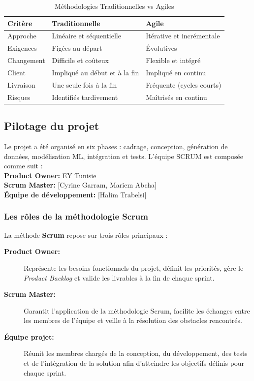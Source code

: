 \documentclass[a4paper, oneside, 12pt]{book}
\newcommand{\thead}[1]{\cellcolor{EYdark}\textcolor{white}{\textbf{#1}}}
\renewcommand{\thead}[1]{\cellcolor{EYyellow}\textcolor{EYdark}{\textbf{#1}}}
\begin{document}
\begin{table}[H]
\centering
\begin{tabular}{|p{4.5cm}|p{5cm}|p{5cm}|}
\hline
\thead{Critère} & \thead{Traditionnelle} & \thead{Agile} \\
\hline
Approche & Linéaire et séquentielle & Itérative et incrémentale \\
\hline
Exigences & Figées au départ & Évolutives \\
\hline
Changement & Difficile et coûteux & Flexible et intégré \\
\hline
Client & Impliqué au début et à la fin & Impliqué en continu \\
\hline
Livraison & Une seule fois à la fin & Fréquente (cycles courts) \\
\hline
Risques & Identifiés tardivement & Maîtrisés en continu \\
\hline
\end{tabular}
\caption{Méthodologies Traditionnelles vs Agiles}
\label{tab:comparaison_methodo}
\end{table}

\subsection{Pilotage du projet}
\hspace{0.5cm}Le projet a été organisé en six phases : cadrage, conception, génération de données, modélisation ML, intégration et tests. L'équipe SCRUM est composée comme suit :\\

\noindent\textbf{Product Owner:} EY Tunisie \\
\textbf{Scrum Master:} [Cyrine Garram, Mariem Abcha] \\
\textbf{Équipe de développement:} [Halim Trabelsi]

\subsubsection{Les rôles de la méthodologie Scrum}

\hspace{0.5cm}La méthode \textbf{Scrum} repose sur trois rôles principaux :

\begin{description}
    \item[\textbf{Product Owner:}] Représente les besoins fonctionnels du projet, définit les priorités, gère le \textit{Product Backlog} et valide les livrables à la fin de chaque sprint.
    \item[\textbf{Scrum Master:}] Garantit l'application de la méthodologie Scrum, facilite les échanges entre les membres de l'équipe et veille à la résolution des obstacles rencontrés.
    \item[\textbf{Équipe projet:}] Réunit les membres chargés de la conception, du développement, des tests et de l'intégration de la solution afin d'atteindre les objectifs définis pour chaque sprint.
\end{description}
\end{document}
